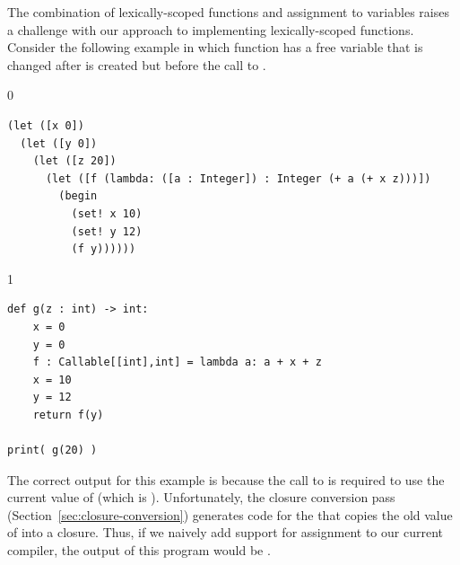 \documentclass[7x10,nocrop]{TimesAPriori_MIT}%
\def\racketEd{0}
\def\pythonEd{1}
\def\edition{0}
\begin{document}
The combination of lexically-scoped functions and assignment to
variables raises a challenge with our approach to implementing
lexically-scoped functions. Consider the following example in which
function  has a free variable  that is changed after
 is created but before the call to .
{\if\edition\racketEd
\begin{lstlisting}
(let ([x 0])
  (let ([y 0])
    (let ([z 20])
      (let ([f (lambda: ([a : Integer]) : Integer (+ a (+ x z)))])
        (begin
          (set! x 10)
          (set! y 12)
          (f y))))))
\end{lstlisting}
\fi}
{\if\edition\pythonEd
\begin{lstlisting}
def g(z : int) -> int:
    x = 0
    y = 0  
    f : Callable[[int],int] = lambda a: a + x + z
    x = 10
    y = 12
    return f(y)

print( g(20) )
\end{lstlisting}
\fi}
The correct output for this example is  because the call to
 is required to use the current value of  (which is
). Unfortunately, the closure conversion pass
(Section~\ref{sec:closure-conversion}) generates code for the
 that copies the old value of  into a
closure. Thus, if we naively add support for assignment to our current
compiler, the output of this program would be .
\end{document}
